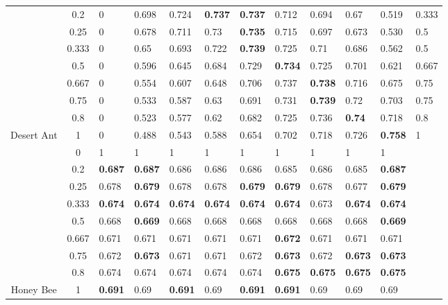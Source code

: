 \begin{table} [h]
\begin{tabular}{|c|c||l|l|l|l|l|l|l|l|l||l|}
&    0.2                  & 0 & 0.698 & 0.724 & \textbf{0.737} & \textbf{0.737} & 0.712 & 0.694 & 0.67  & 0.519 & 0.333\\
&    0.25                 & 0 & 0.678 & 0.711 & 0.73  & \textbf{0.735} & 0.715 & 0.697 & 0.673 & 0.530 & 0.5 \\
&    0.333                & 0 & 0.65  & 0.693 & 0.722 & \textbf{0.739} & 0.725 & 0.71  & 0.686 & 0.562 & 0.5\\
&    0.5                  & 0 & 0.596 & 0.645 & 0.684 & 0.729 & \textbf{0.734} & 0.725 & 0.701 & 0.621 & 0.667\\
&    0.667                & 0 & 0.554 & 0.607 & 0.648 & 0.706 & 0.737 & \textbf{0.738} & 0.716 & 0.675 & 0.75\\
&    0.75                 & 0 & 0.533 & 0.587 & 0.63  & 0.691 & 0.731 & \textbf{0.739} & 0.72  & 0.703  & 0.75 \\
&    0.8                  & 0 & 0.523 & 0.577 & 0.62  & 0.682 & 0.725 & 0.736 & \textbf{0.74}  & 0.718 & 0.8\\
\multirow{-9}{*}{Desert Ant}&    1                    & 0 & 0.488 & 0.543 & 0.588 & 0.654 & 0.702 & 0.718 & 0.726 & \textbf{0.758} & 1\\ \hline
&        0  & 1     & 1     & 1     & 1     & 1     & 1     & 1     & 1     & 1  &   \\
&    0.2                  & \textbf{0.687} &\textbf{0.687} & 0.686 & 0.686 & 0.686 & 0.685 & 0.686 & 0.685 & \textbf{0.687} &\\
&    0.25                 & 0.678 & \textbf{0.679} & 0.678 & 0.678 &\textbf{0.679} & \textbf{0.679} & 0.678 & 0.677 & \textbf{0.679} &\\
&    0.333                & \textbf{0.674} & \textbf{0.674} & \textbf{0.674} & \textbf{0.674} & \textbf{0.674} & \textbf{0.674} & 0.673 & \textbf{0.674} &\textbf{0.674} &\\
&    0.5                  & 0.668 & \textbf{0.669} & 0.668 & 0.668 & 0.668 & 0.668 & 0.668 & 0.668 & \textbf{0.669} &\\
&    0.667                & 0.671 & 0.671 & 0.671 & 0.671 & 0.671 & \textbf{0.672} & 0.671 & 0.671 & 0.671 &\\
&    0.75                 & 0.672 & \textbf{0.673} & 0.671 & 0.671 & 0.672 &\textbf{0.673} & 0.672 & \textbf{0.673} & \textbf{0.673}&\\
&    0.8                  & 0.674 & 0.674 & 0.674 & 0.674 & 0.674 & \textbf{0.675} &  \textbf{0.675} &  \textbf{0.675} & \textbf{0.675}& \\
\multirow{-9}{*}{Honey Bee}&    1                    & \textbf{0.691} & 0.69  & \textbf{0.691} & 0.69  & \textbf{0.691} &  \textbf{0.691}& 0.69  & 0.69  & 0.69  &\\ \hline

    \end{tabular}

\end{table}

